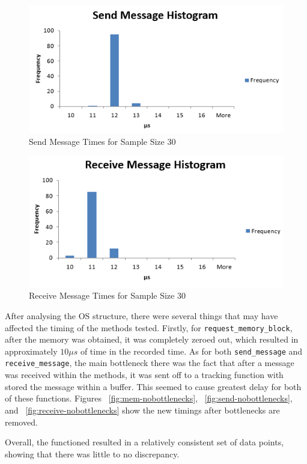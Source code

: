 \documentclass[se]{uw-wkrpt}
\begin{document}
\begin{figure}[bp!]
\centering
\includegraphics[width=120mm]{SendMessageHistogram.png}
\caption{Send Message Times for Sample Size 30}
\label{fig:send}
\end{figure}

\begin{figure}[bp!]
\centering
\includegraphics[width=120mm]{ReceiveMessageHistogram.png}
\caption{Receive Message Times for Sample Size 30}
\label{fig:receive}
\end{figure}

After analysing the OS structure, there were several things that may have affected the timing of the methods tested. Firstly, for \texttt{request\_memory\_block}, after the memory was obtained, it was completely zeroed out, which resulted in approximately $10\mu s$ of time in the recorded time. As for both \texttt{send\_message} and \texttt{receive\_message}, the main bottleneck there was the fact that after a message was received within the methods, it was sent off to a tracking function with stored the message within a buffer. This seemed to cause greatest delay for both of these functions. Figures ~\ref{fig:mem-nobottlenecks}, ~\ref{fig:send-nobottlenecks}, and ~\ref{fig:receive-nobottlenecks} show the new timings after bottlenecks are removed. 

Overall, the functioned resulted in a relatively consistent set of data points, showing that there was little to no discrepancy.
\end{document}
